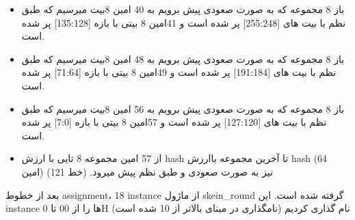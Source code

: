 \begin{itemize}
\item
باز 8 مجموعه که به صورت صعودی پیش برویم به 40 امین 8بیت میرسیم که طبق نظم با بیت های [255:248] پر شده است و 41امین 8 بیتی با بازه [135:128] پر شده است.
\item
باز 8 مجموعه که به صورت صعودی پیش برویم به 48 امین 8بیت میرسیم که طبق نظم با بیت های [191:184] پر شده است و 49امین 8 بیتی با بازه [71:64] پر شده است.
\item
باز 8 مجموعه که به صورت صعودی پیش برویم به 56 امین 8بیت میرسیم که طبق نظم با بیت های [127:120] پر شده است و 57امین 8 بیتی با بازه [7:0] پر شده است.
\item
از 57 امین مجموعه 8 تایی با ارزش hash تا آخرین مجموعه باارزش hash (64 امین) نیز به صورت صعودی و طبق نظم پیش میرود. (خط 121)

\end{itemize}

بعد از خطوط assignment، 18 instance از ماژول skein\_round گرفته شده است.
این instance ها را از 00 تا 0H نام گذاری کردیم (نامگذاری در مبنای بالاتر از 10 شده است)

